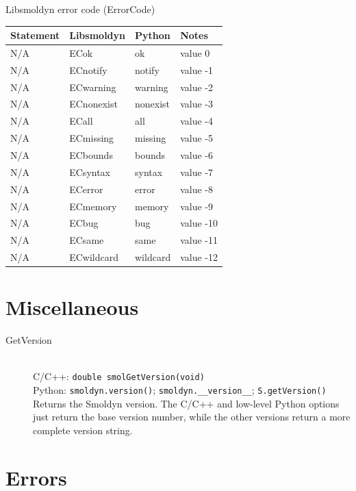 \documentclass {scrbook}
\newcommand {\ttt} {\texttt}
\begin{document}
Libsmoldyn error code (ErrorCode)
\begin{longtable}[c]{llll}
Statement & Libsmoldyn & Python & Notes\\
\hline
N/A & ECok & ok & value 0\\
N/A & ECnotify & notify & value -1\\
N/A & ECwarning & warning & value -2\\
N/A & ECnonexist & nonexist & value -3\\
N/A & ECall & all & value -4\\
N/A & ECmissing & missing & value -5\\
N/A & ECbounds & bounds & value -6\\
N/A & ECsyntax & syntax & value -7\\
N/A & ECerror & error & value -8\\
N/A & ECmemory & memory & value -9\\
N/A & ECbug & bug & value -10\\
N/A & ECsame & same & value -11\\
N/A & ECwildcard & wildcard & value -12
\end{longtable}


\section{Miscellaneous}

\begin{description}

\item[GetVersion]
\hfill \\
C/C++: \ttt{double smolGetVersion(void)}\\
Python: \ttt{smoldyn.version()}; \ttt{smoldyn.\_\_version\_\_}; \ttt{S.getVersion()}\\
Returns the Smoldyn version. The C/C++ and low-level Python options just return the base version number, while the other versions return a more complete version string.

\end{description}

\section{Errors}
\end{document}
